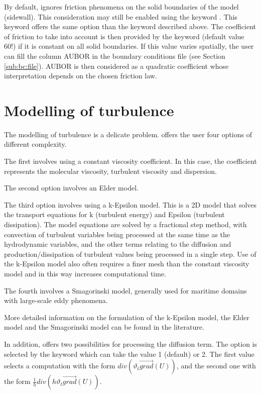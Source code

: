  By default,  ignores friction phenomena on the solid boundaries of the model (sidewall). This consideration may still be enabled using the keyword . 
This keyword offers the same option than the keyword  described above. The coefficient of friction to take into account is then provided by the keyword  (default value 60!) if it is constant on all solid boundaries. If this value varies spatially, the user can fill the column AUBOR in the boundary conditions file (see Section \ref{sub:bc:file}). AUBOR is then considered as a quadratic coefficient whose interpretation depends on the chosen friction law.


\section{ Modelling of turbulence}
\label{sec:mod:turbul}
 The modelling of turbulence is a delicate problem.  offers the user four options of different complexity.

 The first involves using a constant viscosity coefficient. In this case, the coefficient represents the molecular viscosity, turbulent viscosity and dispersion.

 The second option involves an Elder model.

 The third option involves using a k-Epsilon model. This is a 2D model that solves the transport equations for k (turbulent energy) and Epsilon (turbulent dissipation). The model equations are solved by a fractional step method, with convection of turbulent variables being processed at the same time as the hydrodynamic variables, and the other terms relating to the diffusion and production/dissipation of turbulent values being processed in a single step. Use of the k-Epsilon model also often requires a finer mesh than the constant viscosity model and in this way increases computational time.

 The fourth involves a Smagorinski model, generally used for maritime domains with large-scale eddy phenomena.

 More detailed information on the formulation of the k-Epsilon model, the Elder model and the Smagorinski model can be found in the literature.

 In addition,  offers two possibilities for processing the diffusion term. The option is selected by the keyword  which can take the value 1 (default) or 2. The first value selects a computation with the form $div\left({\vartheta }_t\overrightarrow{grad}\left(U\right)\right)$, and the second one with the form $\frac{1}{h}div\left({h\vartheta }_t\overrightarrow{grad}\left(U\right)\right)$.

